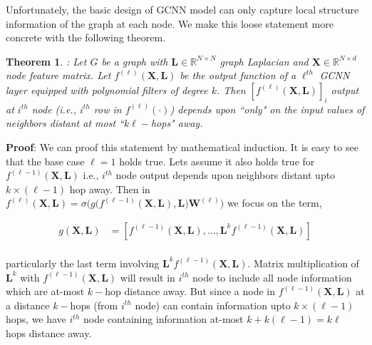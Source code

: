 \documentclass{article}
\newtheorem{theorem}{Theorem}
\begin{document}
Unfortunately, the basic design of GCNN model   can   only capture local structure information of the graph at each node. We make this loose statement more concrete with the following theorem.

\begin{theorem}\label{thm:k_hop_info}:
	\textit{Let  $G$ be a graph with $\mathbf{L}\in \mathbb{R}^{N \times N}$ graph Laplacian and $\mathbf{X}\in \mathbb{R}^{N \times d}$ node feature matrix. Let $f^{(\ell)}(\mathbf{X}, \mathbf{L})$ be the output function of a $\ell^{th}$  GCNN layer equipped with polynomial filters of degree $k$. Then $[f^{(\ell)}(\mathbf{X}, \mathbf{L})]_{i}$ output at $i^{th}$ node (i.e., $i^{th}$ row in $f^{(\ell)}(\cdot)$) depends upon ``only" on the   input values of  neighbors distant at most ``$k\ell-$hops" away.}%
\end{theorem}

\noindent\textbf{Proof}:  We can   proof this statement by mathematical induction. It is easy to see that the base case  $\ell=1$ holds true. Lets assume it also holds true for $f^{(\ell-1)}(\mathbf{X}, \mathbf{L})$ i.e., $i^{th}$ node output   depends upon neighbors distant upto $k\times (\ell-1)$ hop away. Then in  $f^{(\ell)}(\mathbf{X}, \mathbf{L})   = \sigma \Big( g\big(f^{(\ell-1)}(\mathbf{X}, \mathbf{L}), \mathbf{L}\big) \mathbf{W}^{(\ell)}\Big)$  we focus on the term,

\begin{equation}\label{eq:proof}
\begin{split}
g(\mathbf{X}, \mathbf{L}) & =[f^{(\ell-1)}(\mathbf{X}, \mathbf{L}), \dots, \mathbf{L}^{k}f^{(\ell-1)}(\mathbf{X}, \mathbf{L})] \\
\end{split}
\end{equation}

 particularly the last term involving $\mathbf{L}^{k}f^{(\ell-1)}(\mathbf{X}, \mathbf{L})$. Matrix multiplication of $\mathbf{L}^{k}$ with $f^{(\ell-1)}(\mathbf{X}, \mathbf{L})$   will result in $i^{th}$ node to include all node information which are at-most $k-$hop distance away. But since a node in $f^{(\ell-1)}(\mathbf{X}, \mathbf{L})$ at a distance $k-$hops (from $i^{th}$ node) can contain information upto $k\times (\ell-1)$ hops, we have $i^{th}$ node containing information at-most $k+k(\ell-1)=k\ell$ hops distance away. %
\end{document}
